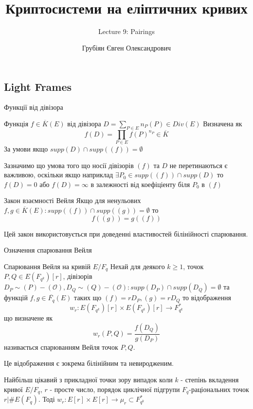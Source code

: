 \documentclass[9pt]{beamer}
\title{Криптосистеми на еліптичних кривих} %
\subtitle{Lecture 9: Pairings}
\author{Грубіян Євген Олександрович}
\begin{document}
  \frame{\maketitle}


  \begin{darkframes}
      
    \section{Light Frames}

\begin{frame}{Функції від дівізора}
    \begin{block}{Функція $f \in \overline{K}(E)$ від дівізора $D = \sum_{P\in E} n_P(P) \in Div(E)$}
        Визначена як 
        $$
        f(D) = \prod_{P\in E} f(P)^{n_P} \in \overline{K}
        $$
        За умови якщо $supp(D) \cap supp((f)) = \emptyset$
    \end{block}
    Зазначимо що умова того що носії дівізорів $(f)$ та $D$ не перетинаються є важливою, оскільки якщо наприклад $\exists P_0 \in supp((f)) \cap supp(D)$ то $f(D)=0$ або $f(D)=\infty $ в залежності від коефіціенту біля $P_0$ в $(f)$
    \begin{block}{Закон взаємності Вейля}
    Якщо для ненульових $f,g \in \overline{K}(E): supp((f)) \cap supp((g)) = \emptyset $ то $$ f((g)) = g((f)) $$
    \end{block}
    Цей закон використовується при доведенні властивостей білінійності спарювання.
\end{frame}

\begin{frame}{Означення спарювання Вейля}
\begin{block}{Спарювання Вейля на кривій $E/F_q$}
    Нехай для деякого $k\ge1$, точок $P,Q \in E(F_{q^k})[r]$, дівізорів $D_P \sim (P)-(\mathcal{O}), D_Q \sim (Q) - (\mathcal{O}):supp(D_P)\cap supp(D_Q) = \emptyset$ та функцій $f,g\in\overline{F_q}(E)$ таких що $(f) =rD_P, (g) = rD_Q$ то відображення $$w_r:E(F_{q^k})[r] \times E(F_{q^k})[r] \to F_{q^k}^*$$
    що визначене як $$w_r(P,Q) = \frac{f(D_Q)}{g(D_P)}$$ називається спарюванням Вейля точок $P,Q$. 
\end{block}
Це відображення є зокрема білінійним та невиродженим.

Найбільш цікавий з прикладної точки зору випадок коли $k$ - степінь вкладення кривої $E/F_q$, $r$ - просте число, порядок циклічної підгрупи $F_q$-раціональних точок $r | \# E(F_q)$. Тоді $w_r:E[r] \times E[r] \to \mu_r \subset F_{q^k}^*$


\end{frame}
\end{darkframes}
\end{document}
